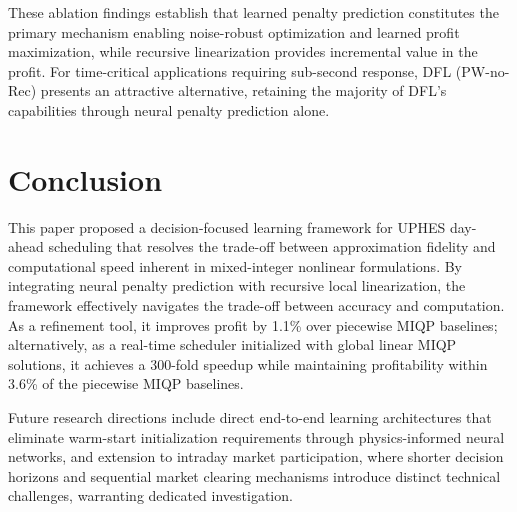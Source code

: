 \documentclass[journal]{IEEEtran}
\begin{document}
These ablation findings establish that learned penalty prediction constitutes the primary mechanism enabling noise-robust optimization and learned profit maximization, while recursive linearization provides incremental value in the profit. For time-critical applications requiring sub-second response, DFL (PW-no-Rec) presents an attractive alternative, retaining the majority of DFL's capabilities through neural penalty prediction alone.

\section{Conclusion}
\label{sec:conclusion}

This paper proposed a decision-focused learning framework for UPHES day-ahead scheduling that resolves the trade-off between approximation fidelity and computational speed inherent in mixed-integer nonlinear formulations. By integrating neural penalty prediction with recursive local linearization, the framework effectively navigates the trade-off between accuracy and computation. As a refinement tool, it improves profit by 1.1\% over piecewise MIQP baselines; alternatively, as a real-time scheduler initialized with global linear MIQP solutions, it achieves a 300-fold speedup while maintaining profitability within 3.6\% of the piecewise MIQP baselines.

Future research directions include direct end-to-end learning architectures that eliminate warm-start initialization requirements through physics-informed neural networks, and extension to intraday market participation, where shorter decision horizons and sequential market clearing mechanisms introduce distinct technical challenges, warranting dedicated investigation.



\end{document}
